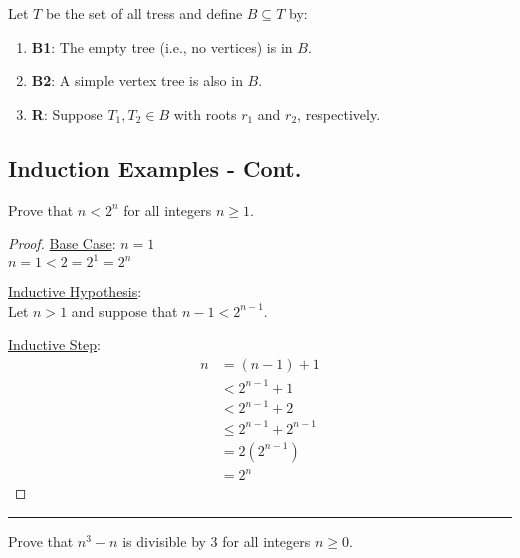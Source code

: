 \documentclass{article}
\def \proofDistance {5pt}
\newcommand{\proofseparator}{\par\noindent\rule{\textwidth}{0.4pt}}
\newcommand{\pf}[1]{
    \vspace{\proofDistance}
    \begin{proof}
    #1
    \end{proof}
    \proofseparator
}
\begin{document}
        
        \begin{example}
            Let $T$ be the set of all tress and define $B \subseteq T$ by: \\
            \begin{enumerate}
                \item \textbf{B1}: The empty tree (i.e., no vertices) is in $B$. 
                \item \textbf{B2}: A simple vertex tree is also in $B$. 
                \item \textbf{R}: Suppose $T_1,T_2\in B$ with roots $r_1$ and $r_2$, respectively.
            \end{enumerate}
        \end{example}

    \newpage

    \subsection{Induction Examples - Cont.}
        \begin{example}
            Prove that $n < 2^n$ for all integers $n \geq 1$.
        \end{example}
        \pf{
        \item \underline{Base Case}: $n = 1$ \\
            $n = 1 < 2 = 2^1 = 2^n$ \\
            \item \underline{Inductive Hypothesis}: \\
            Let $n > 1$ and suppose that $n-1 < 2^{n-1}$. \\
            \item \underline{Inductive Step}:
            \begin{align*}
                n &= (n-1) + 1 \\
                &< 2^{n-1} + 1 \\
                &< 2^{n-1} + 2\\
                &\leq 2^{n-1} + 2^{n-1}\\
                &= 2(2^{n-1})\\
                &= 2^n
            \end{align*}
        }

        \begin{example}
            Prove that $n^3 - n$ is divisible by 3 for all integers $n \geq 0$. \\
        \end{example}
        
\end{document}
